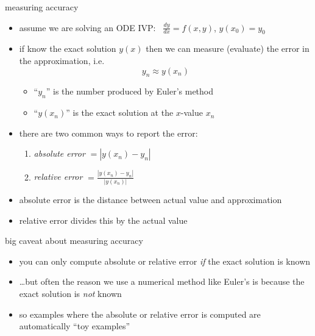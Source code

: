 \documentclass{beamer}
\begin{document}
\begin{frame}{measuring accuracy}

\begin{itemize}
\item assume we are solving an ODE IVP:  \, $\frac{dy}{dx} = f(x,y)$, $y(x_0)=y_0$
\item if know the exact solution $y(x)$ then we can measure (evaluate) the error in the approximation, i.e.
    $$y_n \approx y(x_n)$$
    \vspace{-4mm}
    \begin{itemize}
    \item ``$y_n$'' is the number produced by Euler's method
    \item ``$y(x_n)$'' is the exact solution at the $x$-value $x_n$
    \end{itemize}
\item there are two common ways to report the error:
    \begin{enumerate}
    \item \emph{absolute error} $=|y(x_n) - y_n|$
    \item \emph{relative error} $=\frac{|y(x_n) - y_n|}{|y(x_n)|}$
    \end{enumerate}
\item absolute error is the distance between actual value and approximation
\item relative error divides this by the actual value
\end{itemize}
\end{frame}


\begin{frame}{big caveat about measuring accuracy}

\begin{itemize}
\item you can only compute absolute or relative error \emph{if} the exact solution is known
\item \dots but often the reason we use a numerical method like Euler's is \alert{because the exact solution is \emph{not} known}
\item so examples where the absolute or relative error is computed are automatically ``toy examples''
\end{itemize}
\end{frame}
\end{document}
